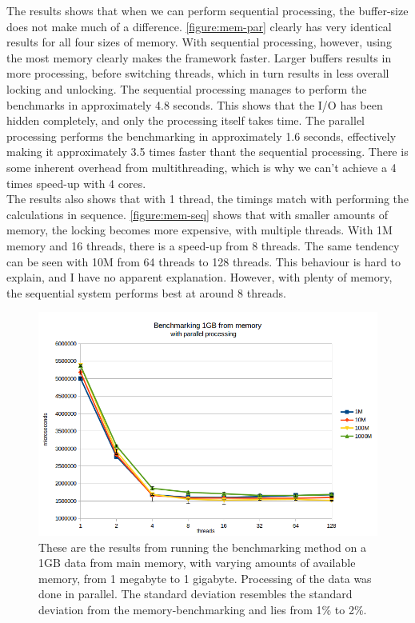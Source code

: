 \documentclass[a4paper]{article}
\begin{document}
The results shows that when we can perform sequential processing, the buffer-size does not make much of a difference. \autoref{figure:mem-par} clearly has very identical results for all four sizes of memory. With sequential processing, however, using the most memory clearly makes the framework faster. Larger buffers results in more processing, before switching threads, which in turn results in less overall locking and unlocking. The sequential processing manages to perform the benchmarks in approximately 4.8 seconds. This shows that the I/O has been hidden completely, and only the processing itself takes time. The parallel processing performs the benchmarking in approximately 1.6 seconds, effectively making it approximately 3.5 times faster thant the sequential processing. There is some inherent overhead from multithreading, which is why we can't achieve a 4 times speed-up with 4 cores.\\

The results also shows that with 1 thread, the timings match with performing the calculations in sequence. \autoref{figure:mem-seq} shows that with smaller amounts of memory, the locking becomes more expensive, with multiple threads. With 1M memory and 16 threads, there is a speed-up from 8 threads. The same tendency can be seen with 10M from 64 threads to 128 threads. This behaviour is hard to explain, and I have no apparent explanation. However, with plenty of memory, the sequential system performs best at around 8 threads. 


\begin{figure}
	\begin{adjustwidth}{-0.5in}{-0.5in}
    \centering
     \includegraphics[scale=0.7]{../test_results/mem_par.png}
  	\caption{These are the results from running the benchmarking method on a 1GB data from main memory, with varying amounts of available memory, from 1 megabyte to 1 gigabyte. Processing of the data was done in parallel. The standard deviation resembles the standard deviation from the memory-benchmarking and lies from 1\% to 2\%.}
	\label{figure:mem-par}
	\end{adjustwidth}
\end{figure}
\end{document}

